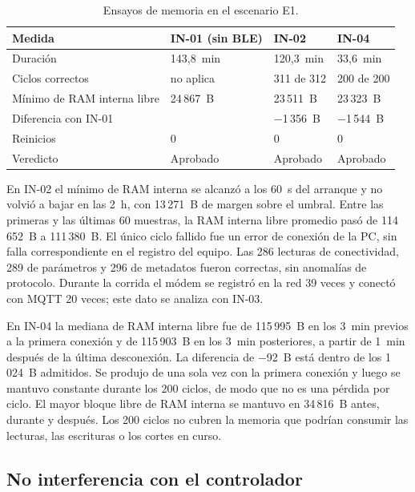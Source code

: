 \begin{table}[htbp]
\centering
\caption{Ensayos de memoria en el escenario E1.}
\label{tab:ensayos_heap}
\small
\begin{tabular}{L{0.3\textwidth} L{0.18\textwidth} L{0.18\textwidth} L{0.18\textwidth}}
\toprule
\textbf{Medida} & \textbf{IN-01 (sin BLE)} & \textbf{IN-02} & \textbf{IN-04} \\
\midrule
Duración & 143,8~min & 120,3~min & 33,6~min \\
Ciclos correctos & no aplica & 311 de 312 & 200 de 200 \\
Mínimo de RAM interna libre & 24\,867~B & 23\,511~B & 23\,323~B \\
Diferencia con IN-01 & & $-$1\,356~B & $-$1\,544~B \\
Reinicios & 0 & 0 & 0 \\
Veredicto & Aprobado & Aprobado & Aprobado \\
\bottomrule
\end{tabular}
\end{table}

En IN-02 el mínimo de RAM interna se alcanzó a los 60~s del arranque y no volvió a bajar en las 2~h, con 13\,271~B de margen sobre el umbral. Entre las primeras y las últimas 60 muestras, la RAM interna libre promedio pasó de 114\,652~B a 111\,380~B. El único ciclo fallido fue un error de conexión de la PC, sin falla correspondiente en el registro del equipo. Las 286 lecturas de conectividad, 289 de parámetros y 296 de metadatos fueron correctas, sin anomalías de protocolo. Durante la corrida el módem se registró en la red 39 veces y conectó con MQTT 20 veces; este dato se analiza con IN-03.

En IN-04 la mediana de RAM interna libre fue de 115\,995~B en los 3~min previos a la primera conexión y de 115\,903~B en los 3~min posteriores, a partir de 1~min después de la última desconexión. La diferencia de $-$92~B está dentro de los 1\,024~B admitidos. Se produjo de una sola vez con la primera conexión y luego se mantuvo constante durante los 200 ciclos, de modo que no es una pérdida por ciclo. El mayor bloque libre de RAM interna se mantuvo en 34\,816~B antes, durante y después. Los 200 ciclos no cubren la memoria que podrían consumir las lecturas, las escrituras o los cortes en curso.

\subsection{No interferencia con el controlador}
\label{subsec:ensayos_no_interferencia}

